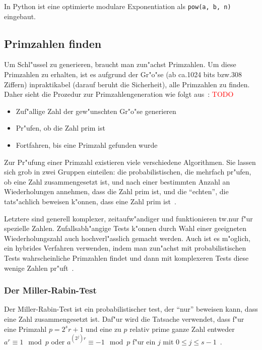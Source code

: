 \documentclass[12pt]{article}
\newcommand{\todo}[1]{\textcolor{red}{\mbox{TODO}}\marginpar{\textcolor{red}{#1}}}
\begin{document}
In Python ist eine optimierte modulare Exponentiation als \lstinline{pow(a, b, n)} eingebaut.

\subsection{Primzahlen finden}
Um Schl"ussel zu generieren, braucht man zun"achst Primzahlen.
Um diese Primzahlen zu erhalten, ist es aufgrund der Gr"o"se
(ab ca.\@ 1024 bits bzw.\@ 308 Ziffern)
inpraktikabel (darauf beruht die Sicherheit), alle Primzahlen zu finden.
Daher sieht die Prozedur zur Primzahlengeneration wie folgt aus~\cite{hac}: \todo{Fast 1 zu 1 "ubersetzt. Anders formatieren?}
\begin{itemize}
    \item Zuf"allige Zahl der gew"unschten Gr"o"se generieren
    \item Pr"ufen, ob die Zahl prim ist
    \item Fortfahren, bis eine Primzahl gefunden wurde
\end{itemize}

Zur Pr"ufung einer Primzahl existieren viele verschiedene Algorithmen.
Sie lassen sich grob in zwei Gruppen einteilen:
die probabilistischen, die mehrfach pr"ufen, ob eine Zahl zusammengesetzt ist,
und nach einer bestimmten Anzahl an Wiederholungen annehmen, dass die Zahl prim ist,
und die "`echten"', die tats"achlich beweisen k"onnen, dass eine Zahl prim ist~\cite{hac}.

Letztere sind generell komplexer, zeitaufw"andiger und funktionieren tw.\@ nur
f"ur spezielle Zahlen.
Zufallsabh"angige Tests k"onnen durch Wahl einer geeigneten Wiederholungszahl
auch hochverl"asslich gemacht werden.
Auch ist es m"oglich, ein hybrides Verfahren verwenden,
indem man zun"achst mit probabilistischen Tests
wahrscheinliche Primzahlen findet und dann mit komplexeren Tests
diese wenige Zahlen pr"uft~\cite{hac}.

\subsubsection{Der Miller-Rabin-Test}
Der Miller-Rabin-Test ist ein probabilistischer test, der "`nur"' beweisen kann,
dass eine Zahl zusammengesetzt ist.
Daf"ur wird die Tatsache verwendet, dass f"ur eine Primzahl $p = 2^s r+1$ und eine
zu $p$ relativ prime ganze Zahl entweder $a^r \equiv 1 \mod p$ oder
$a^{(2^j)r} \equiv -1 \mod p$ f"ur ein $j$ mit $0 \leq j \leq s-1$~\cite{hac}.
\end{document}
